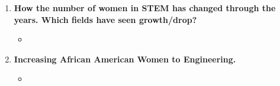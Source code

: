 \documentclass[12pt,a4paper]{article}
\begin{document}
\begin{enumerate}
\begin{itemize}
    \end{itemize}
    \item {} \textbf{How the number of women in STEM has changed through the years. Which fields have seen growth/drop?}
    \begin{itemize}
      \item 
    \end{itemize}
    \item {} \textbf{Increasing African American Women to Engineering.}
    \begin{itemize}
      \item \href{https://www.nsbe.org/getattachment/News-Media/NSBE-News/ignored-potential/NSBE_IgnoredPotential_Whitepaper_TXT-FINAL.PDF.aspx}{} \imp{\&} 
    \end{itemize}
  \end{enumerate}
\end{document}
